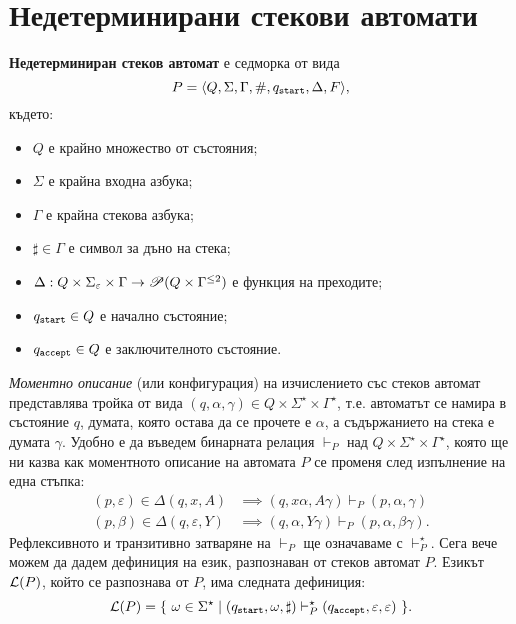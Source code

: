 \section{Недетерминирани стекови автомати}

{\bf Недетерминиран стеков автомат} е седморка от вида
\[P = \langle{Q,\Sigma,\Gamma,\#,q_{\texttt{start}},\Delta,F}\rangle,\] където:
\begin{itemize}
\item
  $Q$ е крайно множество от състояния;
\item  
  $\Sigma$ е крайна входна азбука;
\item
  $\Gamma$ е крайна стекова азбука;
\item
  $\sharp \in \Gamma$ е символ за дъно на стека;
\item
  $\Delta:Q\times\Sigma_\varepsilon\times \Gamma \rightarrow \mathscr{P}(Q\times\Gamma^{\leq 2})$ 
  е функция на преходите;    
\item
  $q_{\texttt{start}} \in Q$ е начално състояние;
\item
  $q_{\texttt{accept}} \in Q$ е заключителното състояние.
\end{itemize}

{\em Моментно описание} (или конфигурация) на изчислението със стеков автомат представлява тройка от вида $(q,\alpha,\gamma) \in Q\times\Sigma^\star\times\Gamma^\star$,
т.е. автоматът се намира в състояние $q$, думата, която остава да се прочете е $\alpha$,
а съдържанието на стека е думата $\gamma$.
Удобно е да въведем бинарната релация $\vdash_P$ над $Q\times\Sigma^\star\times\Gamma^\star$,
която ще ни казва как моментното описание на автомата $P$ се променя след изпълнение на една стъпка:
\begin{align*}
  (p,\varepsilon) \in \Delta(q,x,A) & \implies (q,x\alpha,A\gamma) \vdash_P (p,\alpha,\gamma)\\
  (p,\beta) \in \Delta(q,\varepsilon,Y) & \implies (q,\alpha,Y\gamma) \vdash_P (p,\alpha,\beta\gamma).
\end{align*}
Рефлексивното и транзитивно затваряне на $\vdash_P$ ще означаваме с $\vdash^\star_P$.
Сега вече можем да дадем дефиниция на език, разпознаван от стеков автомат $P$.
Езикът $\mathcal{L}(P)$, който се разпознава от $P$, има следната дефиниция:
\[\mathcal{L}(P) = \{\ \omega \in \Sigma^\star \mid (q_{\texttt{start}},\omega,\sharp) \vdash^\star_P (q_{\texttt{accept}},\varepsilon,\varepsilon)\ \}.\]

